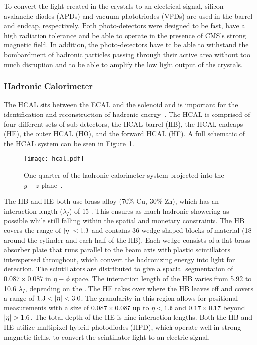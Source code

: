 To convert the light created in the crystals to an electrical signal, silicon
avalanche diodes (APDs) and vacuum phototriodes (VPDs) are used in the barrel
and endcap, respectively. Both photo-detectors were designed to be fast, have a
high radiation tolerance and be able to operate in the presence of CMS's strong
magnetic field. In addition, the photo-detectors have to be able to withstand
the bombardment of hadronic particles passing through their active area without
too much disruption and to be able to amplify the low light output of the \pbw
crystals.

\subsubsection{Hadronic Calorimeter}
\label {sec:cms_hcal}

The HCAL sits between the ECAL and the solenoid and is important for the
identification and reconstruction of hadronic energy~\cite{hcalperformance}.
The HCAL is comprised of four different sets of sub-detectors, the HCAL barrel
(HB), the HCAL endcaps (HE), the outer HCAL (HO), and the forward HCAL (HF). A
full schematic of the HCAL system can be seen in Figure~\ref{fig:cms_hcal}.

\begin{figure}[!htb]
\begin{center}
\texttt{[image: hcal.pdf]}
\caption{\label{fig:cms_hcal}
One quarter of the hadronic calorimeter system projected into the $y-z$
plane~\cite{hcalperformance}.
}
\end{center}
\end{figure}

The HB and HE both use brass alloy (70\% Cu, 30\% Zn), which has an interaction
length ($\lambda_I$) of 15 \cm. This ensures as much hadronic showering as
possible while still falling within the spatial and monetary constraints. The
HB covers the \pr range of $\left|\eta\right| < 1.3$ and contains 36 wedge shaped blocks of
material (18 around the cylinder and each half of the HB). Each wedge consists
of a flat brass absorber plate that runs parallel to the beam axis with plastic
scintillators interspersed throughout, which convert the hadronizing energy
into light for detection. The scintillators are distributed to give a spacial
segmentation of $0.087 \times 0.087$ in $\eta - \phi$ space. The interaction
length of the HB varies from 5.92 to 10.6 $\lambda_I$, depending on the \pr.
The HE takes over where the HB leaves off and covers a \pr range of $1.3 <
\left|\eta\right| < 3.0$. The granularity in this region allows for positional measurements
with a size of $0.087 \times 0.087$ up to $\eta < 1.6$ and $0.17 \times 0.17$
beyond $\left|\eta\right| > 1.6$. The total depth of the HE is nine interaction lengths.
Both the HB and HE utilize multipixel hybrid photodiodes (HPD), which operate
well in strong magnetic fields, to convert the scintillator light to an
electric signal.

